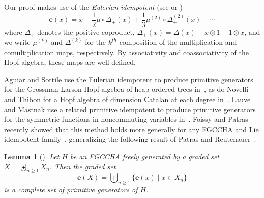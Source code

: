 \documentclass[11pt]{amsart}
\newtheorem{lemma}[theorem]{Lemma}
\theoremstyle{definition}
\numberwithin{equation}{section}
\newcommand{\FGCCHA}{\textsf{FGCCHA}\xspace}
\newcommand{\lucas}[1]{\todo[size=\tiny,color=red!50]{#1 \\ \hfill --- Lucas}}
\newcommand{\eric}[1]{\todo[size=\tiny,color=BurntOrange!50]{#1 \\ \hfill --- Eric}}
\begin{document}
Our proof makes use of the \emph{Eulerian idempotent} (see \cite[\S 1.4]{AS05cc} or \cite[\S 4.5.2]{loday2013cyclic})
\begin{equation}
\label{eq:eulerianidempotent}
\mathbf{e}(x) = x - \frac{1}{2}\mu \circ \Delta_{+}(x) + \frac{1}{3} \mu^{(2)} \circ \Delta_{+}^{(2)}(x) - \cdots 
\end{equation}
where $\Delta_{+}$ denotes the positive coproduct, $\Delta_{+}(x) = \Delta(x) - x \otimes 1 - 1 \otimes x$,
and we write $\mu^{(k)}$ and $\Delta^{(k)}$ for the $k^{th}$
composition of the multiplication and comultiplication maps, respectively.
By associativity and coassociativity of the Hopf algebra, these maps are well defined.

Aguiar and Sottile use the Eulerian idempotent to produce primitive generators for the Grossman-Larson
Hopf algebra of heap-ordered trees in~\cite{AS05cc},
as do Novelli and Thibon for a Hopf algebra of dimension Catalan at each degree in~\cite[\S 5]{NT05}.
Lauve and Mastnak use a related primitive idempotent to produce primitive generators for
the symmetric functions in noncommuting variables in~\cite{LM11}.  
Foissy and Patras recently showed that this method holds more generally for any \FGCCHA and Lie idempotent family~\cite{FP24}, generalizing the following result of Patras and Reutenauer~\cite{PR04}.

\begin{lemma}[{\cite[Lemma 22]{PR04}}]
\label{lemma:primitive generators}
Let $H$ be an \FGCCHA freely generated by a graded set $X = \biguplus_{n \geq 1} X_{n}$.  
Then the graded set
\[
\mathbf{e}(X) = \biguplus_{n \ge 1} \{\mathbf{e}(x) \;|\; x \in X_{n}\}
\]
is a complete set of primitive generators of $H$.
\end{lemma}
\end{document}

